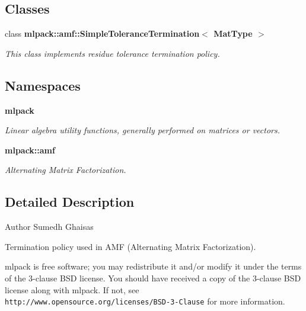 \subsection*{Classes}
\begin{DoxyCompactItemize}
\item 
class {\bf mlpack\+::amf\+::\+Simple\+Tolerance\+Termination$<$ Mat\+Type $>$}
\begin{DoxyCompactList}\small\item\em This class implements residue tolerance termination policy. \end{DoxyCompactList}\end{DoxyCompactItemize}
\subsection*{Namespaces}
\begin{DoxyCompactItemize}
\item 
 {\bf mlpack}
\begin{DoxyCompactList}\small\item\em Linear algebra utility functions, generally performed on matrices or vectors. \end{DoxyCompactList}\item 
 {\bf mlpack\+::amf}
\begin{DoxyCompactList}\small\item\em Alternating Matrix Factorization. \end{DoxyCompactList}\end{DoxyCompactItemize}


\subsection{Detailed Description}
\begin{DoxyAuthor}{Author}
Sumedh Ghaisas
\end{DoxyAuthor}
Termination policy used in A\+MF (Alternating Matrix Factorization).

mlpack is free software; you may redistribute it and/or modify it under the terms of the 3-\/clause B\+SD license. You should have received a copy of the 3-\/clause B\+SD license along with mlpack. If not, see {\tt http\+://www.\+opensource.\+org/licenses/\+B\+S\+D-\/3-\/\+Clause} for more information. 